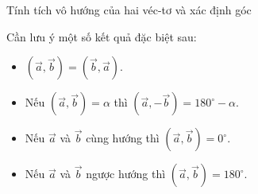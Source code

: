 \begin{dang}{Tính tích vô hướng của hai véc-tơ và xác định góc}
\begin{itemize}
	\end{itemize}
	Cần lưu ý một số kết quả đặc biệt sau:
	\begin{itemize}		
		\item $\left (\overrightarrow{a},\overrightarrow{b}\right )=\left (\overrightarrow{b},\overrightarrow{a}\right )$.
		\item Nếu $ \left(\overrightarrow{a},\overrightarrow{b} \right) =\alpha $ thì $ \left(\overrightarrow{a},-\overrightarrow{b} \right) =180^\circ -\alpha $.
		\item Nếu $\overrightarrow{a}$ và $\overrightarrow{b}$ cùng hướng thì $\left (\overrightarrow{a},\overrightarrow{b}\right )=0^{\circ}$.
		\item Nếu $\overrightarrow{a}$ và $\overrightarrow{b}$ ngược hướng thì $\left (\overrightarrow{a},\overrightarrow{b}\right )=180^{\circ}$.
	\end{itemize}
\end{dang}
\viduminhhoa
